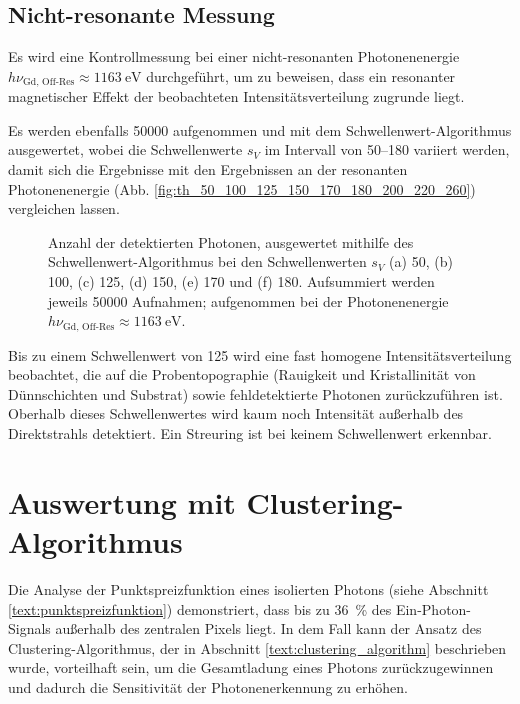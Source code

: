 \subsection{Nicht-resonante Messung}
Es wird eine Kontrollmessung bei einer nicht-resonanten Photonenenergie $h\nu_{\text{Gd, Off-Res}} \approx \SI{1163}{\eV}$ durchgeführt, um zu beweisen, dass ein resonanter magnetischer Effekt der beobachteten Intensitätsverteilung zugrunde liegt.

\noindent
Es werden ebenfalls \SI{50000}{\captures} aufgenommen und mit dem Schwellenwert-Algorithmus ausgewertet, wobei die Schwellenwerte $s_V$ im Intervall von \SIrange{50}{180}{\adu} variiert werden, damit sich die Ergebnisse mit den Ergebnissen an der resonanten Photonenenergie (Abb. \ref{fig:th_50_100_125_150_170_180_200_220_260}) vergleichen lassen.
\begin{figure}[H]
    \centering
    
    \caption{Anzahl der detektierten Photonen, ausgewertet mithilfe des Schwellenwert-Algorithmus bei den Schwellenwerten $s_V$ (a) \SI{50}{\adu}, (b) \SI{100}{\adu}, (c) \SI{125}{\adu}, (d) \SI{150}{\adu}, (e) \SI{170}{\adu} und (f) \SI{180}{\adu}. Aufsummiert werden jeweils \num{50000} Aufnahmen; aufgenommen bei der Photonenenergie $h\nu_\text{Gd, Off-Res} \approx \SI{1163}{\eV}$.}
    \label{fig:th_50_100_125_150_170_180_off_resonance}
\end{figure}
\noindent
Bis zu einem Schwellenwert von \SI{125}{\adu} wird eine fast homogene Intensitätsverteilung beobachtet, die auf die Probentopographie (Rauigkeit und Kristallinität von Dünnschichten und Substrat) sowie fehldetektierte Photonen zurückzuführen ist. Oberhalb dieses Schwellenwertes wird kaum noch Intensität außerhalb des Direktstrahls detektiert. Ein Streuring ist bei keinem Schwellenwert erkennbar.

\section{Auswertung mit Clustering-Algorithmus}
Die Analyse der Punktspreizfunktion eines isolierten Photons (siehe Abschnitt \ref{text:punktspreizfunktion}) demonstriert, dass bis zu \SI{36}{\percent} des Ein-Photon-Signals außerhalb des zentralen Pixels liegt. In dem Fall kann der Ansatz des Clustering-Algorithmus, der in Abschnitt \ref{text:clustering_algorithm} beschrieben wurde, vorteilhaft sein, um die Gesamtladung eines Photons zurückzugewinnen und dadurch die Sensitivität der Photonenerkennung zu erhöhen.

